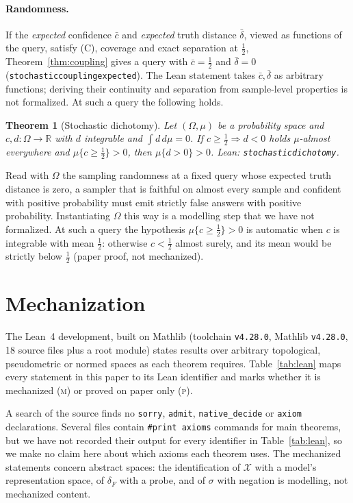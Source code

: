 \documentclass[10pt]{article}
\newtheorem{theorem}{Theorem}
\theoremstyle{definition}
\theoremstyle{remark}
\newcommand{\X}{\mathcal{X}}
\newcommand{\R}{\mathbb{R}}
\newcommand{\conf}{c}
\newcommand{\dF}{\delta_{\!F}}
\newcommand{\leanid}[1]{{\def\_{\textunderscore\allowbreak}\texttt{#1}}}
\newcommand{\mech}{\textsc{m}}   %
\newcommand{\paper}{\textsc{p}}  %
\begin{document}
\paragraph{Randomness.}
If the \emph{expected} confidence $\bar\conf$ and \emph{expected} truth
distance $\bar\delta$, viewed as functions of the query, satisfy (C),
coverage and exact separation at $\tfrac12$, Theorem~\ref{thm:coupling}
gives a query with $\bar\conf=\tfrac12$ and $\bar\delta=0$
(\leanid{stochastic\_coupling\_expected}). The Lean statement takes
$\bar\conf,\bar\delta$ as arbitrary functions; deriving their continuity
and separation from sample-level properties is not formalized. At such a
query the following holds.

\begin{theorem}[Stochastic dichotomy]
\label{thm:dichotomy}
Let $(\Omega,\mu)$ be a probability space and $c,d:\Omega\to\R$ with $d$
integrable and $\int d\,d\mu=0$. If $c\ge\tfrac12\Rightarrow d<0$ holds
$\mu$-almost everywhere and $\mu\{c\ge\tfrac12\}>0$, then
$\mu\{d>0\}>0$. Lean: \leanid{stochastic\_dichotomy}.
\end{theorem}

Read with $\Omega$ the sampling randomness at a fixed query whose
expected truth distance is zero, a sampler that is faithful on almost
every sample and confident with positive probability must emit strictly
false answers with positive probability. Instantiating $\Omega$ this way
is a modelling step that we have not formalized. At such a query the
hypothesis $\mu\{c\ge\tfrac12\}>0$ is automatic when $c$ is integrable
with mean $\tfrac12$: otherwise $c<\tfrac12$ almost surely, and its mean
would be strictly below $\tfrac12$ (paper proof, not mechanized).

\section{Mechanization}
\label{sec:lean}

The Lean~4 \citep{moura2021lean} development, built on Mathlib
\citep{mathlib2020} (toolchain \texttt{v4.28.0}, Mathlib
\texttt{v4.28.0}, 18 source files plus a root module) states results over arbitrary
topological, pseudometric or normed spaces as each theorem requires.
Table~\ref{tab:lean} maps every statement in this paper to its Lean
identifier and marks whether it is mechanized (\mech) or proved on paper
only (\paper).

A search of the source finds no \texttt{sorry}, \texttt{admit},
\texttt{native\_decide} or \texttt{axiom} declarations. Several files
contain \texttt{\#print axioms} commands for main theorems, but we have
not recorded their output for every identifier in Table~\ref{tab:lean},
so we make no claim here about which axioms each theorem uses. The mechanized statements concern abstract spaces:
the identification of $\X$ with a model's representation space, of $\dF$
with a probe, and of $\sigma$ with negation is modelling, not
mechanized content.
\end{document}
